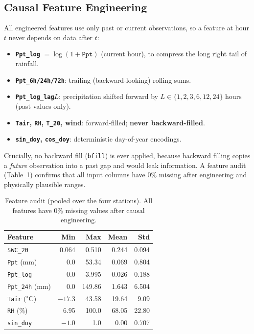 \documentclass[11pt]{article}
\begin{document}
\subsection{Causal Feature Engineering}

All engineered features use only past or current observations, so a feature at
hour $t$ never depends on data after $t$:
\begin{itemize}
    \item \textbf{\texttt{Ppt\_log}} $= \log(1+\texttt{Ppt})$ (current hour), to
    compress the long right tail of rainfall.
    \item \textbf{\texttt{Ppt\_6h/24h/72h}}: trailing (backward-looking) rolling
    sums.
    \item \textbf{\texttt{Ppt\_log\_lag}$L$}: precipitation shifted forward by
    $L\in\{1,2,3,6,12,24\}$ hours (past values only).
    \item \textbf{\texttt{Tair}, \texttt{RH}, \texttt{T\_20}, wind}:
    forward-filled; \textbf{never backward-filled}.
    \item \textbf{\texttt{sin\_doy}, \texttt{cos\_doy}}: deterministic day-of-year
    encodings.
\end{itemize}
Crucially, no backward fill (\texttt{bfill}) is ever applied, because backward
filling copies a \emph{future} observation into a past gap and would leak
information. A feature audit (Table~\ref{tab:audit}) confirms that all input
columns have 0\% missing after engineering and physically plausible ranges.

\begin{table}[h]
\centering
\caption{Feature audit (pooled over the four stations). All features have
0\% missing values after causal engineering.}
\label{tab:audit}
\small
\begin{tabular}{lrrrr}
\toprule
\textbf{Feature} & \textbf{Min} & \textbf{Max} & \textbf{Mean} & \textbf{Std} \\
\midrule
\texttt{SWC\_20}       & 0.064   & 0.510   & 0.244  & 0.094 \\
\texttt{Ppt} (mm)      & 0.0     & 53.34   & 0.069  & 0.804 \\
\texttt{Ppt\_log}      & 0.0     & 3.995   & 0.026  & 0.188 \\
\texttt{Ppt\_24h} (mm) & 0.0     & 149.86  & 1.643  & 6.504 \\
\texttt{Tair} ($^\circ$C) & $-17.3$ & 43.58 & 19.64 & 9.09 \\
\texttt{RH} (\%)       & 6.95    & 100.0   & 68.05  & 22.80 \\
\texttt{sin\_doy}      & $-1.0$  & 1.0     & 0.00   & 0.707 \\
\bottomrule
\end{tabular}
\end{table}
\end{document}
